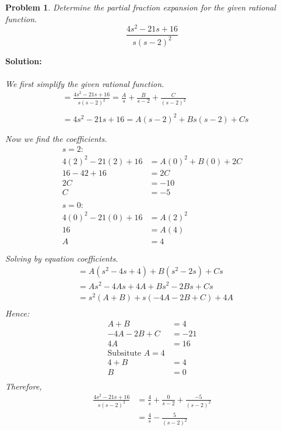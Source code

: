 \documentclass{article}
\newtheorem{problem}{Problem}
\begin{document}
    \begin{problem}
        Determine the partial fraction expansion for the given rational function. 
        \[
            \frac{4s^{2} - 21s + 16}{s(s - 2)^{2}}
        \]
    \end{problem}
    \textbf{Solution:} \\ \\
    \textit{We first simplify the given rational function.} \\
    \begin{align*}
        &= \frac{4s^{2} - 21s + 16}{s(s - 2)^{2}} = \frac{A}{s} + \frac{B}{s - 2} + \frac{C}{(s - 2)^{2}} \\ \\
        &= 4s^{2} - 21s + 16 = A(s - 2)^{2} + Bs(s - 2) + Cs \\ \\
    \end{align*}
    \textit{Now we find the coefficients.} \\
    \begin{align*}
        s = 2: \\
        4(2)^{2} - 21(2) + 16 &= A(0)^{2} + B(0) + 2C \\
        16 - 42 + 16 &= 2C \\
        2C &= -10 \\
        C &= -5 \\ \\
        s = 0: \\
        4(0)^{2} - 21(0) + 16 &= A(2)^{2} \\
        16 &= A(4) \\
        A &= 4 \\ \\
    \end{align*}
    \textit{Solving by equation coefficients.} \\
    \begin{align*}
        &= A(s^{2} - 4s + 4) + B(s^{2} - 2s) + Cs \\
        &= As^{2} - 4As + 4A + Bs^{2} - 2Bs + Cs \\
        &= s^{2}(A + B) +  s(-4A - 2B + C) + 4A \\
    \end{align*}
    \newpage
    \textit{Hence:} \\
    \begin{align*}
        A + B &= 4 \\
        -4A - 2B + C &= -21 \\
        4A &= 16 \\
    \text{Subsitute $A = 4$} \\
        4 + B &= 4 \\
        B &= 0 \\
    \end{align*} 
    \textit{Therefore,} \\
    \begin{align*}
        \frac{4s^{2} -21s + 16}{s(s - 2)^{2}} &= \frac{4}{s} + \frac{0}{s - 2} + \frac{-5}{(s - 2)^{2}} \\
        &= \frac{4}{s} - \frac{5}{(s - 2)^{2}}
    \end{align*}
\end{document}
